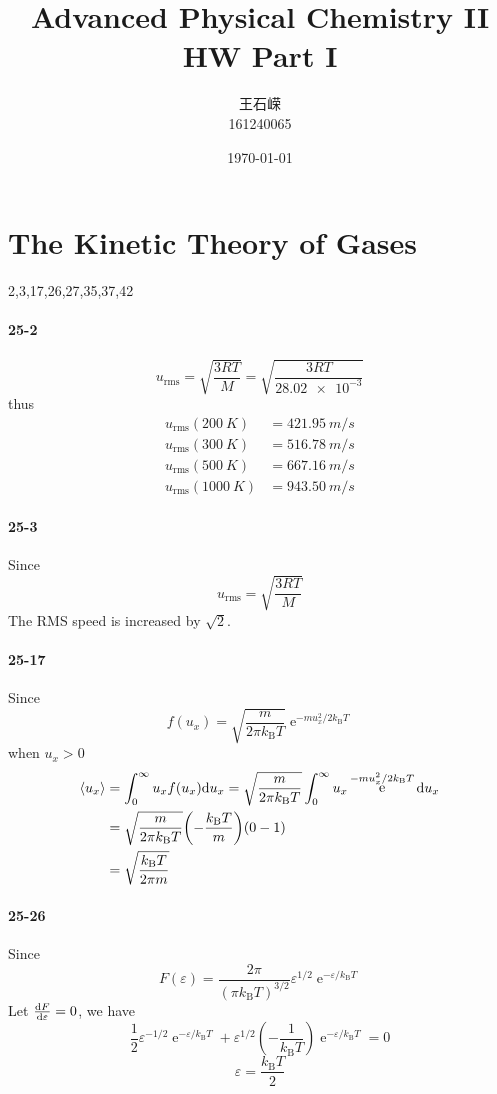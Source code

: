 \documentclass[a4paper]{article}
\title{\textbf{Advanced Physical Chemistry II}\\HW   Part I}
\author{王石嵘
\vspace{5pt}\\
161240065\\
}
\date{\today} %
\DeclareMathOperator{\intinf}{\int_0^\infty}
\DeclareMathOperator{\e}{\mathrm{e}}
\newcommand{\kB}{k_\mathrm{B}}
\newcommand{\ex}[1]{\paragraph{#1}}
\DeclareMathOperator{\rms}{\mathrm{rms}}
\numberwithin{equation}{section}
\begin{document}

\maketitle



\setcounter{section}{24}
\section{The Kinetic Theory of Gases}
2,3,17,26,27,35,37,42\\
\ex{25-2}
\begin{equation}\label{key}
u_{\rms} = \sqrt{\dfrac{3RT}{M}} = \sqrt{\dfrac{3 R T}{\num{28.02e-3}}}
\end{equation}
thus
\begin{align}
u_{\rms}(\SI{200}{K}) &= \SI{421.95}{m/s} \\
u_{\rms}(\SI{300}{K}) &= \SI{516.78}{m/s} \\
u_{\rms}(\SI{500}{K}) &= \SI{667.16}{m/s} \\
u_{\rms}(\SI{1000}{K}) &= \SI{943.50}{m/s} 
\end{align}

\ex{25-3}
Since
\begin{equation}\label{key}
u_{\rms} = \sqrt{\dfrac{3RT}{M}}
\end{equation}
The RMS speed is increased by $ \sqrt{2} $.


\ex{25-17}
Since
\begin{equation}\label{key}
f(u_x) = \sqrt{\dfrac{m}{2\pi\kB T}}\e^{-mu_x^2/2\kB T}
\end{equation}
when $ u_x>0 $
\begin{align}
\ev{u_x} &= \intinf u_x f(u_x)\dd u_x = \sqrt{\dfrac{m}{2\pi\kB T}} \intinf u_x\e^{-mu_x^2/2\kB T} \dd u_x \notag\\
&= \sqrt{\dfrac{m}{2\pi\kB T}} \qty(-\dfrac{\kB T}{m})(0-1) \notag\\
&= \sqrt{\dfrac{\kB T}{2\pi m}}
\end{align}

\ex{25-26}
Since
\begin{equation}\label{key}
F(\varepsilon) = \dfrac{2\pi}{(\pi \kB T)^{3/2}}\varepsilon^{1/2}\e^{-\varepsilon/\kB T}
\end{equation}
Let $ \dv{F}{\varepsilon} = 0 $, we have
\begin{equation}\label{key}
\dfrac{1}{2}\varepsilon^{-1/2}\e^{-\varepsilon/\kB T} + \varepsilon^{1/2}(-\dfrac{1}{\kB T})\e^{-\varepsilon/\kB T} = 0
\end{equation}
\begin{equation}\label{key}
\varepsilon = \dfrac{\kB T}{2}
\end{equation}
\end{document}
